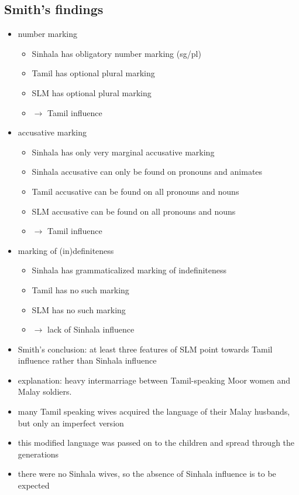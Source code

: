 \documentclass[a4paper,12pt]{article}
\begin{document}
\subsection{Smith's findings}
\begin{itemize}
 \item number marking
	\begin{itemize}
	\item Sinhala has obligatory number marking (sg/pl)
	\item Tamil has optional plural marking
	\item SLM has optional plural marking
	\item $\to$ Tamil influence
	\end{itemize}
 \item accusative marking
	\begin{itemize}
	\item Sinhala has only very marginal accusative marking
	\item Sinhala accusative can only be found on pronouns and animates
	\item Tamil accusative can be found on all pronouns and nouns
	\item SLM accusative can be found on all pronouns and nouns
	\item $\to$ Tamil influence
	\end{itemize}
\item marking of (in)definiteness
	\begin{itemize}
	 \item Sinhala has grammaticalized marking of indefiniteness
	 \item Tamil has no such marking
	 \item SLM has no such marking
	 \item $\to$ lack of Sinhala influence
	\end{itemize}
\item Smith's conclusion: at least three features of SLM point towards Tamil influence rather than Sinhala influence
\item explanation: heavy intermarriage between Tamil-speaking Moor women and Malay soldiers.
\item many Tamil speaking wives acquired the language of their Malay husbands, but only an imperfect version
\item this modified language was passed on to the children and spread through the generations
\item there were no Sinhala wives, so the absence of Sinhala influence is to be expected
\end{itemize}
\end{document}
